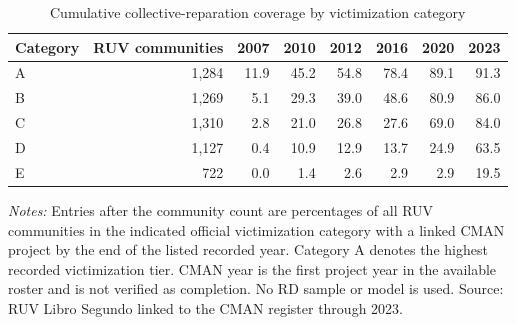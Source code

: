 \begin{table}[!htbp]
\centering
\caption{Cumulative collective-reparation coverage by victimization category}
\label{tab:desc_treatment_category_year}
\begin{tabular}{lrrrrrrr}
\toprule
Category & RUV communities & 2007 & 2010 & 2012 & 2016 & 2020 & 2023 \\
\midrule
A & 1,284 & 11.9 & 45.2 & 54.8 & 78.4 & 89.1 & 91.3 \\
B & 1,269 & 5.1 & 29.3 & 39.0 & 48.6 & 80.9 & 86.0 \\
C & 1,310 & 2.8 & 21.0 & 26.8 & 27.6 & 69.0 & 84.0 \\
D & 1,127 & 0.4 & 10.9 & 12.9 & 13.7 & 24.9 & 63.5 \\
E & 722 & 0.0 & 1.4 & 2.6 & 2.9 & 2.9 & 19.5 \\
\bottomrule
\end{tabular}
\parbox{0.98\linewidth}{\footnotesize \textit{Notes:} Entries after the community count are percentages of all RUV communities in the indicated official victimization category with a linked CMAN project by the end of the listed recorded year. Category A denotes the highest recorded victimization tier. CMAN year is the first project year in the available roster and is not verified as completion. No RD sample or model is used. Source: RUV Libro Segundo linked to the CMAN register through 2023.}
\end{table}
